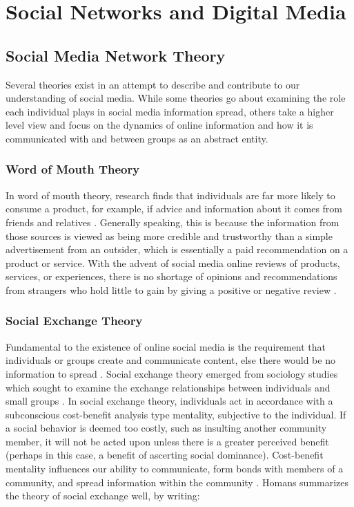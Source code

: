 \chapter{Social Networks and Digital Media}%
\section{Social Media Network Theory}
Several theories exist in an attempt to describe and contribute to our understanding of social media. While some theories go about examining the role each individual plays in social media information spread, others take a higher level view and focus on the dynamics of online information and how it is communicated with and between groups as an abstract entity.

\subsection{Word of Mouth Theory}
In word of mouth theory, research finds that individuals are far more likely to consume a product, for example, if advice and information about it comes from friends and relatives \cite{crotts1999consumer}. Generally speaking, this is because the information from those sources is viewed as being more credible and trustworthy than a simple advertisement from an outsider, which is essentially a paid recommendation on a product or service. With the advent of social media online reviews of products, services, or experiences, there is no shortage of opinions and recommendations from strangers who hold little to gain by giving a positive or negative review \cite{sigala2012social}.

\subsection{Social Exchange Theory}
Fundamental to the existence of online social media is the requirement that individuals or groups create and communicate content, else there would be no information to spread \cite{sigala2012social}. Social exchange theory emerged from sociology studies which sought to examine the exchange relationships between individuals and small groups \cite{emerson1976social}. In social exchange theory, individuals act in accordance with a subconscious cost-benefit analysis type mentality, subjective to the individual. If a social behavior is deemed too costly, such as insulting another community member, it will not be acted upon unless there is a greater perceived benefit (perhaps in this case, a benefit of ascerting social dominance). Cost-benefit mentality influences our ability to communicate, form bonds with members of a community, and spread information within the community \cite{emerson1976social}. Homans summarizes the theory of social exchange well, by writing:

